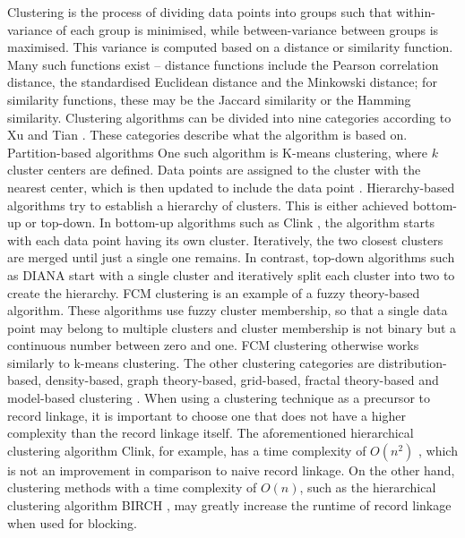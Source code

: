 Clustering is the process of dividing data points into groups such that within-variance of each group is minimised, while between-variance between groups is maximised.
This variance is computed based on a distance or similarity function.
Many such functions exist -- distance functions include the Pearson correlation distance, the standardised Euclidean distance and the Minkowski distance;
for similarity functions, these may be the Jaccard similarity or the Hamming similarity.
Clustering algorithms can be divided into nine categories according to Xu and Tian \cite{xuComprehensiveSurveyClustering2015}.
These categories describe what the algorithm is based on.
Partition-based algorithms
One such algorithm is K-means clustering, where $k$ cluster centers are defined.
Data points are assigned to the cluster with the nearest center, which is then updated to include the data point \cite{lloydLeastSquaresQuantization1982}.
Hierarchy-based algorithms try to establish a hierarchy of clusters.
This is either achieved bottom-up or top-down.
In bottom-up algorithms such as Clink \cite{defaysEfficientAlgorithmComplete1977}, the algorithm starts with each data point having its own cluster.
Iteratively, the two closest clusters are merged until just a single one remains.
In contrast, top-down algorithms such as DIANA \cite{kaufmanDivisiveAnalysisProgram2009} start with a single cluster and iteratively split each cluster into two to create the hierarchy.
\ac{FCM} clustering \cite{dunnFuzzyRelativeISODATA1973} is an example of a fuzzy theory-based algorithm.
These algorithms use fuzzy cluster membership, so that a single data point may belong to multiple clusters and cluster membership is not binary but a continuous number between zero and one.
\Ac{FCM} clustering otherwise works similarly to k-means clustering.
The other clustering categories are distribution-based, density-based, graph theory-based, grid-based, fractal theory-based and model-based clustering \cite{xuComprehensiveSurveyClustering2015}.
When using a clustering technique as a precursor to record linkage, it is important to choose one that does not have a higher complexity than the record linkage itself.
The aforementioned hierarchical clustering algorithm Clink, for example, has a time complexity of $O(n^2)$ \cite{defaysEfficientAlgorithmComplete1977}, which is not an improvement in comparison to naive record linkage.
On the other hand, clustering methods with a time complexity of $O(n)$, such as the hierarchical clustering algorithm BIRCH \cite{zhangBIRCHEfficientData1996}, may greatly increase the runtime of record linkage when used for blocking.

